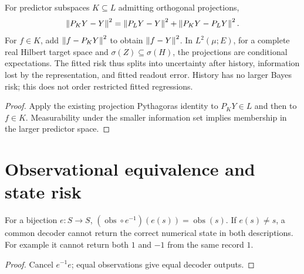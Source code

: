 \begin{theorem}\label{thm:recovery-nested}
  \leanok
  For predictor subspaces $K\subseteq L$ admitting orthogonal projections,
  \[
    \left\lVert P_KY-Y\right\rVert^2=\left\lVert P_LY-Y\right\rVert^2+\left\lVert P_KY-P_LY\right\rVert^2.
  \]
  For $f\in K$, add $\left\lVert f-P_KY\right\rVert^2$ to obtain $\left\lVert f-Y\right\rVert^2$.
  In $L^2(\mu;E)$, for a complete real Hilbert target space and
  $\sigma(Z)\subseteq\sigma(H)$, the projections are conditional expectations.
  The fitted risk thus splits into uncertainty after history, information lost
  by the representation, and fitted readout error. History has no larger Bayes
  risk; this does not order restricted fitted regressions.
\end{theorem}
\begin{proof}\leanok
  Apply the existing projection Pythagoras identity to $P_KY\in L$ and then
  to $f\in K$. Measurability under the smaller information set
  implies membership
  in the larger predictor space.
\end{proof}

\section{Observational equivalence and state risk}\label{sec:bp-identifiability}

\begin{lemma}\label{thm:identifiability-exact}
  \leanok
  For a bijection $e:S\to S$, $(\operatorname{obs}\circ e^{-1})(e(s))
  =\operatorname{obs}(s)$. If $e(s)\ne s$, a common decoder cannot return the
  correct numerical state in both descriptions. For example it cannot return
  both $1$ and $-1$ from the same record $1$.
\end{lemma}
\begin{proof}\leanok
  Cancel $e^{-1}e$; equal observations give equal decoder outputs.
\end{proof}

